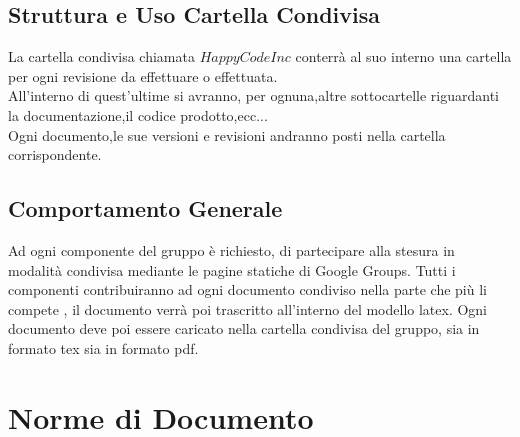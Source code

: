 \documentclass[11pt,titlepage,a4paper]{report}
\begin{document}
\section{Struttura e Uso Cartella Condivisa}
	La cartella condivisa chiamata \(HappyCodeInc\) conterr\`a al suo interno una cartella
	per ogni revisione da effettuare o effettuata.\\
	All'interno di quest'ultime si avranno, per ognuna,altre sottocartelle riguardanti
	la documentazione,il codice prodotto,ecc...\\
	Ogni documento,le sue versioni e revisioni andranno posti nella cartella corrispondente. 

\section{Comportamento Generale}
	Ad ogni componente del gruppo \`e richiesto, di partecipare alla stesura in
	modalit\`a condivisa mediante le pagine statiche di Google Groups. 
	Tutti i componenti contribuiranno ad ogni documento condiviso 
	nella parte che pi\`u li compete , il documento verr\`a poi trascritto
	all'interno del modello latex.
	Ogni documento deve poi essere caricato  nella cartella condivisa del gruppo,
	sia in formato tex sia in formato pdf.

\chapter{Norme di Documento}
\end{document}
